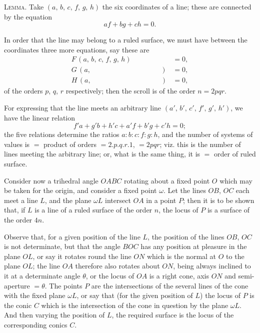\documentclass[11pt,a4paper]{article}
\theoremstyle{plain}
\theoremstyle{definition}
\theoremstyle{remark}
\begin{document}
\textsc{Lemma.} Take $(a,\,b,\,c,\,f,\,g,\,h)$ the six coordinates of a line; these are connected by the equation
\[
af + bg + ch = 0.
\]

In order that the line may belong to a ruled surface, we must have between the coordinates three more equations, say these are
\begin{align*}
F\,(a,\,b,\,c,\,f,\,g,\,h) &= 0,\\
G\,(a,\quad \,\phantom{b,}\,\quad \,\phantom{c,}\,\quad \,\phantom{f,}\,\quad \,\phantom{g,}\,\quad) &= 0,\\
H\,(a,\quad \,\phantom{b,}\,\quad \,\phantom{c,}\,\quad \,\phantom{f,}\,\quad \,\phantom{g,}\,\quad) &= 0,
\end{align*}
of the orders $p$, $q$, $r$ respectively; then the scroll is of the order $n = 2pqr$.

For expressing that the line meets an arbitrary line $(a',\,b',\,c',\,f',\,g',\,h')$, we have the linear relation
\[
f'a + g'b + h'c + a'f + b'g + c'h = 0;
\]
the five relations determine the ratios $a:b:c:f:g:h$, and the number of systems of values is $=$ product of orders $= 2. p. q. r. 1$, $= 2pqr$; viz. this is the number of lines meeting the arbitrary line; or, what is the same thing, it is $=$ order of ruled surface.

Consider now a trihedral angle $OABC$ rotating about a fixed point $O$ which may be taken for the origin, and consider a fixed point $\omega$. Let the lines $OB$, $OC$ each meet a line $L$, and the plane $\omega L$ intersect $OA$ in a point $P$; then it is to be shown that, if $L$ is a line of a ruled surface of the order $n$, the locus of $P$ is a surface of the order $4n$.

Observe that, for a given position of the line $L$, the position of the lines $OB$, $OC$ is not determinate, but that the angle $BOC$ has any position at pleasure in the plane $OL$, or say it rotates round the line $ON$ which is the normal at $O$ to the plane $OL$; the line $OA$ therefore also rotates about $ON$, being always inclined to it at a determinate angle $\theta$, or the locus of $OA$ is a right cone, axis $ON$ and semi-aperture $=\theta$. The points $P$ are the intersections of the several lines of the cone with the fixed plane $\omega L$, or say that (for the given position of $L$) the locus of $P$ is the conic $C$ which is the intersection of the cone in question by the plane $\omega L$. And then varying the position of $L$, the required surface is the locus of the corresponding conics $C$.
\end{document}
